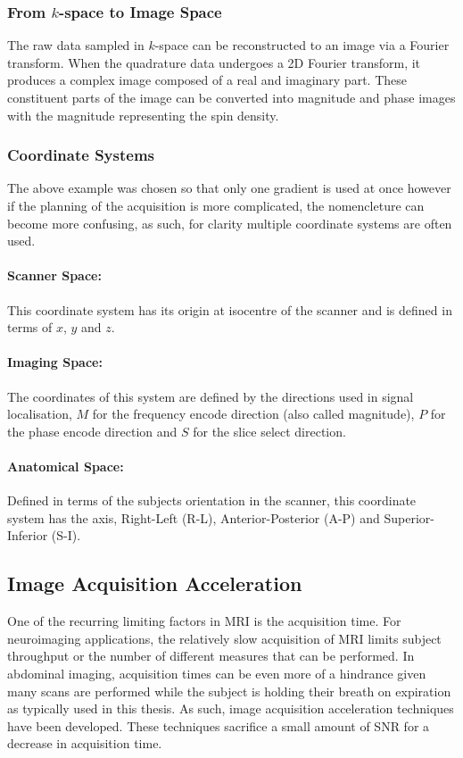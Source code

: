 \subsubsection{From $k$-space to Image Space}

The raw data sampled in $k$-space can be reconstructed to an image via a Fourier transform. When the quadrature data undergoes a 2D Fourier transform, it produces a complex image composed of a real and imaginary part. These constituent parts of the image can be converted into magnitude and phase images with the magnitude representing the spin density.

\subsubsection{Coordinate Systems}
The above example was chosen so that only one gradient is used at once however if the planning of the acquisition is more complicated, the nomencleture can become more confusing, as such, for clarity multiple coordinate systems are often used.
\paragraph{Scanner Space:}
This coordinate system has its origin at isocentre of the scanner and is defined in terms of $x$, $y$ and $z$.
\paragraph{Imaging Space:}
The coordinates of this system are defined by the directions used in signal localisation, $M$ for the frequency encode direction (also called magnitude), $P$ for the phase encode direction and $S$ for the slice select direction.
\paragraph{Anatomical Space:}
Defined in terms of the subjects orientation in the scanner, this coordinate system has the axis, Right-Left (R-L), Anterior-Posterior (A-P) and Superior-Inferior (S-I).

\subsection{Image Acquisition Acceleration}
One of the recurring limiting factors in \ac{MRI} is the acquisition time. For neuroimaging applications, the relatively slow acquisition of \ac{MRI} limits subject throughput or the number of different measures that can be performed. In abdominal imaging, acquisition times can be even more of a hindrance given many scans are performed while the subject is holding their breath on expiration as typically used in this thesis. As such, image acquisition acceleration techniques have been developed. These techniques sacrifice a small amount of \ac{SNR} for a decrease in acquisition time.

